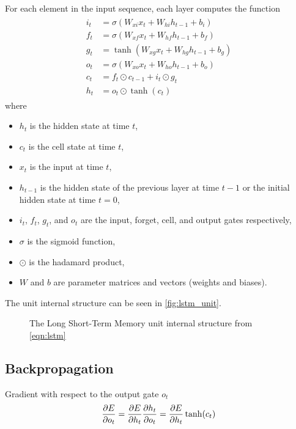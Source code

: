 For each element in the input sequence, each layer computes the function
\begin{align}
    \label{eqn:lstm}
    \begin{split}
        i_t &= \sigma(W_{xi}x_t + W_{hi}h_{t-1} + b_{i}) \\
        f_t &= \sigma(W_{xf}x_t + W_{hf}h_{t-1} + b_{f}) \\
        g_t &= \tanh(W_{xg}x_t +  W_{hg}h_{t-1} + b_{g}) \\
        o_t &= \sigma(W_{xo}x_t + W_{ho}h_{t-1} + b_{o}) \\
        c_t &= f_t \odot c_{t-1} + i_t \odot g_t \\
        h_t &= o_t \odot \tanh(c_t)
    \end{split}
\end{align}
where
\begin{itemize}
    \item $h_t$ is the hidden state at time $t$,
    \item $c_t$ is the cell state at time $t$,
    \item $x_t$ is the input at time $t$,
    \item $h_{t-1}$ is the hidden state of the previous layer at time $t-1$ or the initial hidden state at time $t=0$,
    \item $i_t$, $f_t$, $g_t$, and $o_t$ are the input, forget, cell, and output gates respectively,
    \item $\sigma$ is the sigmoid function,
    \item $\odot$ is the hadamard product,
    \item $W$ and $b$ are parameter matrices and vectors (weights and biases).
\end{itemize}
The  unit internal structure can be seen in \autoref{fig:lstm_unit}.

\begin{figure}[htbp]
    \centering
    \caption{The Long Short-Term Memory unit internal structure from \autoref{eqn:lstm}}
    \label{fig:lstm_unit}
\end{figure}

\subsection{Backpropagation}

Gradient with respect to the output gate $o_t$
\newcommand{\pdvEot}{\pdv{E}{h_t}\tanh(c_t)}
\begin{equation}
    \pdv{E}{o_t}
    =
    \pdv{E}{h_t}\pdv{h_t}{o_t}
    =
    \pdvEot
\end{equation}

